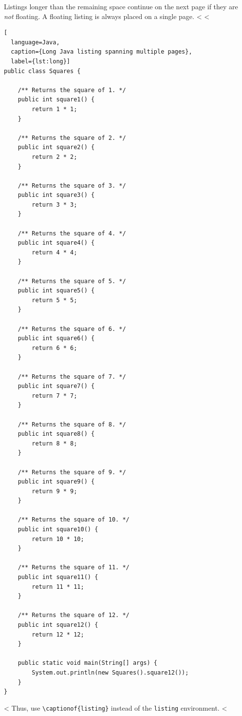 Listings longer than the remaining space continue on the next page if they are \emph{not} floating.
A floating listing is always placed on a single page.
<%
<%

\begin{lstlisting}[
  language=Java,
  caption={Long Java listing spanning multiple pages},
  label={lst:long}]
public class Squares {

    /** Returns the square of 1. */
    public int square1() {
        return 1 * 1;
    }

    /** Returns the square of 2. */
    public int square2() {
        return 2 * 2;
    }

    /** Returns the square of 3. */
    public int square3() {
        return 3 * 3;
    }

    /** Returns the square of 4. */
    public int square4() {
        return 4 * 4;
    }

    /** Returns the square of 5. */
    public int square5() {
        return 5 * 5;
    }

    /** Returns the square of 6. */
    public int square6() {
        return 6 * 6;
    }

    /** Returns the square of 7. */
    public int square7() {
        return 7 * 7;
    }

    /** Returns the square of 8. */
    public int square8() {
        return 8 * 8;
    }

    /** Returns the square of 9. */
    public int square9() {
        return 9 * 9;
    }

    /** Returns the square of 10. */
    public int square10() {
        return 10 * 10;
    }

    /** Returns the square of 11. */
    public int square11() {
        return 11 * 11;
    }

    /** Returns the square of 12. */
    public int square12() {
        return 12 * 12;
    }

    public static void main(String[] args) {
        System.out.println(new Squares().square12());
    }
}
\end{lstlisting}
<%
Thus, use \verb+\captionof{listing}+ instead of the \verb+listing+ environment.
<%


